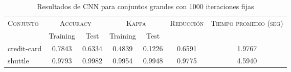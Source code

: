 \begin{table}[]
\centering
\begin{tabular}{l c c c c c c}
\hline
\multirow{2}{*}{\textsc{Conjunto}}
	& \multicolumn{2}{c}{\textsc{Accuracy}}
	& \multicolumn{2}{c}{\textsc{Kappa}}
	& \textsc{Reducción}
	& \textsc{Tiempo promedio (seg)} \\
	& Training & Test
	& Training & Test \\ 
\hline
\hline

credit-card & 0.7843 & 0.6334 & 0.4839 & 0.1226 & 0.6591 & 1.9767 \\
shuttle & 0.9793 & 0.9982 & 0.9954 & 0.9948 & 0.9775 & 4.5940 \\

\hline
\end{tabular}
\caption{Resultados de CNN para conjuntos grandes con 1000 iteraciones fijas}
\label{res-large-cnn}
\end{table}

